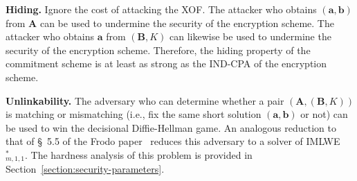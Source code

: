 \textbf{Hiding.} Ignore the cost of attacking the XOF. The attacker who obtains $(\mathbf{a}, \mathbf{b})$ from $\mathbf{A}$ can be used to undermine the security of the encryption scheme. The attacker who obtains $\mathbf{a}$ from $(\mathbf{B}, K)$ can likewise be used to undermine the security of the encryption scheme. Therefore, the hiding property of the commitment scheme is at least as strong as the IND-CPA of the encryption scheme.

\textbf{Unlinkability.} The adversary who can determine whether a pair $(\mathbf{A}, (\mathbf{B}, K))$ is matching or mismatching (i.e., fix the same short solution $(\mathbf{a}, \mathbf{b})$ or not) can be used to win the decisional Diffie-Hellman game. An analogous reduction to that of \S~5.5 of the Frodo paper~\cite{frodo} reduces this adversary to a solver of IMLWE$^*_{m,1,1}$. The hardness analysis of this problem is provided in Section~\ref{section:security-parameters}.
